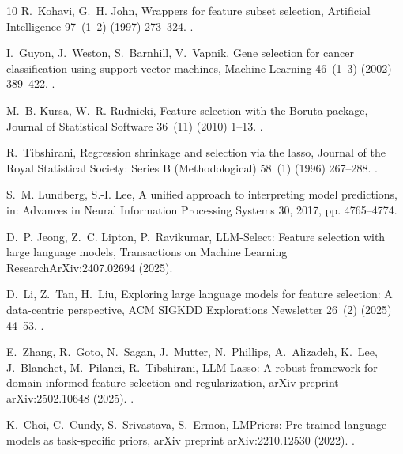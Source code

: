 \documentclass[preprint,12pt]{elsarticle}
\begin{document}
\begin{thebibliography}{10}
R.~Kohavi, G.~H. John, Wrappers for feature subset selection, Artificial
  Intelligence 97~(1--2) (1997) 273--324.
\newblock \href {https://doi.org/10.1016/S0004-3702(97)00043-X}
  {}.

I.~Guyon, J.~Weston, S.~Barnhill, V.~Vapnik, Gene selection for cancer
  classification using support vector machines, Machine Learning 46~(1--3)
  (2002) 389--422.
\newblock \href {https://doi.org/10.1023/A:1012487302797}
  {}.

M.~B. Kursa, W.~R. Rudnicki, Feature selection with the {B}oruta package,
  Journal of Statistical Software 36~(11) (2010) 1--13.
\newblock \href {https://doi.org/10.18637/jss.v036.i11}
  {}.

R.~Tibshirani, Regression shrinkage and selection via the lasso, Journal of the
  Royal Statistical Society: Series B (Methodological) 58~(1) (1996) 267--288.
\newblock \href {https://doi.org/10.1111/j.2517-6161.1996.tb02080.x}
  {}.

S.~M. Lundberg, S.-I. Lee, A unified approach to interpreting model
  predictions, in: Advances in Neural Information Processing Systems 30, 2017,
  pp. 4765--4774.

D.~P. Jeong, Z.~C. Lipton, P.~Ravikumar, {LLM-Select}: Feature selection with
  large language models, Transactions on Machine Learning
  ResearchArXiv:2407.02694 (2025).

D.~Li, Z.~Tan, H.~Liu, Exploring large language models for feature selection: A
  data-centric perspective, ACM SIGKDD Explorations Newsletter 26~(2) (2025)
  44--53.
\newblock \href {https://doi.org/10.1145/3715073.3715077}
  {}.

E.~Zhang, R.~Goto, N.~Sagan, J.~Mutter, N.~Phillips, A.~Alizadeh, K.~Lee,
  J.~Blanchet, M.~Pilanci, R.~Tibshirani, {LLM-Lasso}: A robust framework for
  domain-informed feature selection and regularization, arXiv preprint
  arXiv:2502.10648 (2025).
\newblock \href {https://doi.org/10.48550/arXiv.2502.10648}
  {}.

K.~Choi, C.~Cundy, S.~Srivastava, S.~Ermon, {LMPriors}: Pre-trained language
  models as task-specific priors, arXiv preprint arXiv:2210.12530 (2022).
\newblock \href {https://doi.org/10.48550/arXiv.2210.12530}
  {}.


\end{thebibliography}
\end{document}
